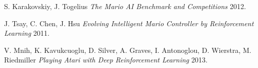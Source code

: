 \documentclass[12pt]{article}
\begin{document}
\begin{thebibliography}{1}

 S. Karakovskiy, J. Togelius {\em The Mario AI Benchmark and Competitions} 2012.

  J. Tsay, C. Chen, J. Hsu {\em Evolving Intelligent Mario Controller by Reinforcement Learning} 2011.

 V. Mnih, K. Kavukcuoglu, D. Silver, A. Graves, I. Antonoglou, D. Wierstra, M. Riedmiller {\em Playing Atari with Deep Reinforcement Learning} 2013.

\end{thebibliography}
\end{document}
